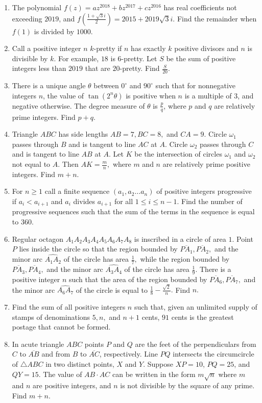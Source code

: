 \documentclass{article}%
\begin{document}
\begin{enumerate}
%
\item%
The polynomial $f(z)=az^{2018}+bz^{2017}+cz^{2016}$ has real coefficients not exceeding $2019$, and $f\left(\frac{1+\sqrt{3}i}{2}\right)=2015+2019\sqrt{3}i$. Find the remainder when $f(1)$ is divided by $1000$.
%
\item%
Call a positive integer $n$ $k$-pretty if $n$ has exactly $k$ positive divisors and $n$ is divisible by $k$. For example, $18$ is $6$-pretty. Let $S$ be the sum of positive integers less than $2019$ that are $20$-pretty. Find $\frac{S}{20}$.
%
\item%
There is a unique angle $\theta$ between $0^{\circ}$ and $90^{\circ}$ such that for nonnegative integers $n$, the value of $\tan{\left(2^{n}\theta\right)}$ is positive when $n$ is a multiple of $3$, and negative otherwise. The degree measure of $\theta$ is $\frac{p}{q}$, where $p$ and $q$ are relatively prime integers. Find $p+q$.
%
\item%
Triangle $ABC$ has side lengths $AB=7, BC=8,$ and $CA=9.$ Circle $\omega_1$ passes through $B$ and is tangent to line $AC$ at $A.$ Circle $\omega_2$ passes through $C$ and is tangent to line $AB$ at $A.$ Let $K$ be the intersection of circles $\omega_1$ and $\omega_2$ not equal to $A.$ Then $AK=\frac mn,$ where $m$ and $n$ are relatively prime positive integers. Find $m+n.$
%
\item%
For $n \ge 1$ call a finite sequence $(a_1, a_2 \ldots a_n)$ of positive integers progressive if $a_i < a_{i+1}$ and $a_i$ divides $a_{i+1}$ for all $1 \le i \le n-1$. Find the number of progressive sequences such that the sum of the terms in the sequence is equal to $360$.
%
\item%
Regular octagon $A_1A_2A_3A_4A_5A_6A_7A_8$ is inscribed in a circle of area $1.$ Point $P$ lies inside the circle so that the region bounded by $\overline{PA_1},\overline{PA_2},$ and the minor arc $\widehat{A_1A_2}$ of the circle has area $\frac{1}{7},$ while the region bounded by $\overline{PA_3},\overline{PA_4},$ and the minor arc $\widehat{A_3A_4}$ of the circle has area $\frac{1}{9}.$ There is a positive integer $n$ such that the area of the region bounded by $\overline{PA_6},\overline{PA_7},$ and the minor arc $\widehat{A_6A_7}$ of the circle is equal to $\frac{1}{8}-\frac{\sqrt2}{n}.$ Find $n.$
%
\item%
Find the sum of all positive integers $n$ such that, given an unlimited supply of stamps of denominations $5,n,$ and $n+1$ cents, $91$ cents is the greatest postage that cannot be formed.
%
\item%
In acute triangle $ABC$ points $P$ and $Q$ are the feet of the perpendiculars from $C$ to $\overline{AB}$ and from $B$ to $\overline{AC}$, respectively. Line $PQ$ intersects the circumcircle of $\triangle ABC$ in two distinct points, $X$ and $Y$. Suppose $XP=10$, $PQ=25$, and $QY=15$. The value of $AB\cdot AC$ can be written in the form $m\sqrt n$ where $m$ and $n$ are positive integers, and $n$ is not divisible by the square of any prime. Find $m+n$.
%
\end{enumerate}

%
\end{document}
